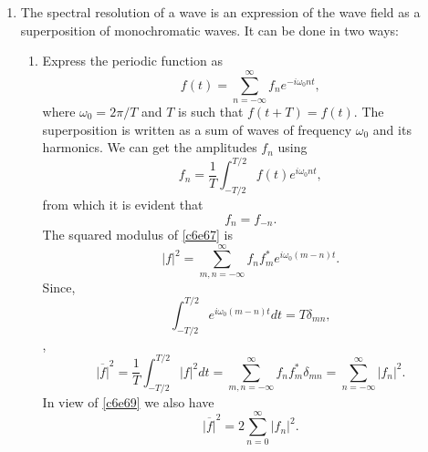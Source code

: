 \begin{enumerate}
\item The spectral resolution of a wave is an expression of the wave field as a
superposition of monochromatic waves. It can be done in two ways:
\begin{enumerate}
\item Express the periodic function as
\begin{equation}\label{c6e67}
f(t) = \sum_{n=-\infty}^\infty f_n e^{-i\omega_0 nt},
\end{equation}
where $\omega_0 = 2\pi/T$ and $T$ is such that $f(t + T) = f(t)$. The 
superposition is written as a sum of waves of frequency $\omega_0$ and its 
harmonics. We can get the amplitudes $f_n$ using
\begin{equation}\label{c6e68}
f_n = \frac{1}{T}\int_{-T/2}^{T/2} f(t)e^{i\omega_0 nt},
\end{equation}
from which it is evident that
\begin{equation}\label{c6e69}
f_n = f_{-n}.
\end{equation}
The squared modulus of \eqref{c6e67} is
\begin{equation}\label{c6e70}
|f|^2 = \sum_{m, n = -\infty}^\infty f_n f_m^\ast e^{i\omega_0(m - n)t}.
\end{equation}
Since,
\begin{equation}\label{c6e71}
\int_{-T/2}^{T/2}e^{i\omega_0(m - n)t}dt = T\delta_{mn},
\end{equation},
\begin{equation}\label{c6e71a}
\overline{|f|}^2 = \frac{1}{T}\int_{-T/2}^{T/2}|f|^2 dt = 
\sum_{m, n = -\infty}^\infty f_n f_m^\ast \delta_{mn} = 
\sum_{n=-\infty}^\infty |f_n|^2.
\end{equation}
In view of \eqref{c6e69} we also have
\begin{equation}\label{c6e72}
\overline{|f|}^2 = 2\sum_{n=0}^\infty |f_n|^2.
\end{equation}


\end{enumerate}
\end{enumerate}
